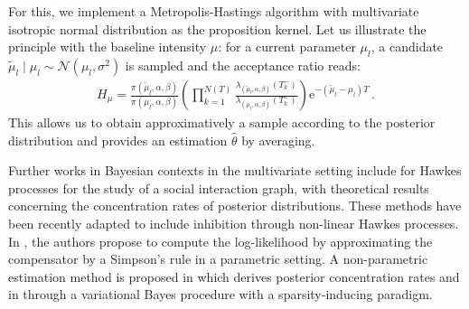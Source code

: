 For this, we implement a Metropolis-Hastings algorithm with multivariate isotropic normal distribution as the proposition kernel.
Let us illustrate the principle with the baseline intensity $\mu$: for a current parameter $\mu_l$, a candidate $\tilde \mu_l\mid \mu_l\sim\mathcal{N}(\mu_l, \sigma^2)$ is sampled and the acceptance ratio reads:
\begin{align*}
    H_\mu = \frac{\pi(\tilde\mu_l, \alpha, \beta)}{\pi(\mu_l, \alpha, \beta)}\left(\prod_{k=1}^{N(T)}\frac{\lambda_{(\tilde \mu_l,\alpha, \beta)}(T_k^-)}{\lambda_{(\mu_l, \alpha, \beta)}(T_k^-)}\right)\mathrm{e}^{-(\tilde\mu_l - \mu_l) T}\,.
\end{align*}
This allows us to obtain approximatively a sample according to the posterior distribution and provides an estimation $\hat \theta$ by averaging.

Further works in Bayesian contexts in the multivariate setting include \textcite{Blundell2012} for Hawkes processes for the study of a social interaction graph, \textcite{Donnet2020} with theoretical results concerning the concentration rates of posterior distributions. These methods have been recently adapted to include inhibition through non-linear Hawkes processes.
In \textcite{Deutsch2022}, the authors propose to compute the log-likelihood by approximating the compensator by a Simpson's rule in a parametric setting.
A non-parametric estimation method is proposed in \textcite{Sulem2024} which derives posterior concentration rates and in \textcite{Sulem2023} through a variational Bayes procedure with a sparsity-inducing paradigm. 



